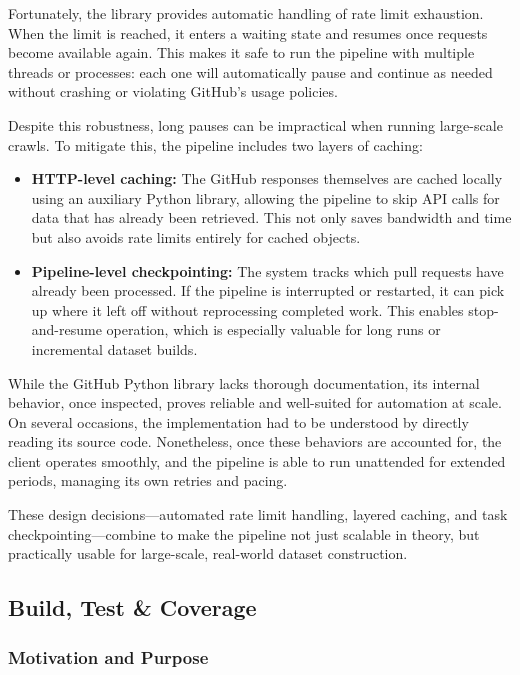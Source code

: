 Fortunately, the library provides automatic handling of rate limit exhaustion. When the limit is
reached, it enters a waiting state and resumes once requests become available again. This makes it
safe to run the pipeline with multiple threads or processes: each one will automatically pause and
continue as needed without crashing or violating GitHub’s usage policies.

Despite this robustness, long pauses can be impractical when running large-scale crawls. To mitigate
this, the pipeline includes two layers of caching:

\begin{itemize}
	\item \textbf{HTTP-level caching:} The GitHub responses themselves are cached locally using an
	      auxiliary Python library, allowing the pipeline to skip API calls for data that has already
	      been retrieved. This not only saves bandwidth and time but also avoids rate limits entirely
	      for cached objects.

	\item \textbf{Pipeline-level checkpointing:} The system tracks which pull requests have already
	      been processed. If the pipeline is interrupted or restarted, it can pick up where it left
	      off without reprocessing completed work. This enables stop-and-resume operation, which is
	      especially valuable for long runs or incremental dataset builds.
\end{itemize}

While the GitHub Python library lacks thorough documentation, its internal behavior, once inspected,
proves reliable and well-suited for automation at scale. On several occasions, the implementation
had to be understood by directly reading its source code. Nonetheless, once these behaviors are
accounted for, the client operates smoothly, and the pipeline is able to run unattended for extended
periods, managing its own retries and pacing.

These design decisions—automated rate limit handling, layered caching, and task
checkpointing—combine to make the pipeline not just scalable in theory, but practically usable for
large-scale, real-world dataset construction.

\subsection{Build, Test \& Coverage}


\subsubsection{Motivation and Purpose}

